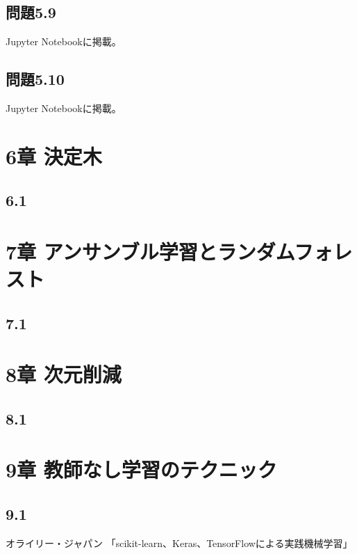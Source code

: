 \documentclass[a4j,twocolumn]{jsarticle}
\begin{document}
\subsection{問題5.9}
Jupyter Notebookに掲載。

\subsection{問題5.10}
Jupyter Notebookに掲載。



\section{6章 決定木}
\subsection{6.1}

\section{7章 アンサンブル学習とランダムフォレスト}
\subsection{7.1}

\section{8章 次元削減}
\subsection{8.1}

\section{9章 教師なし学習のテクニック}
\subsection{9.1}




\begin{thebibliography}{}
オライリー・ジャパン 「scikit-learn、Keras、TensorFlowによる実践機械学習」
\end{thebibliography}
\end{document}
